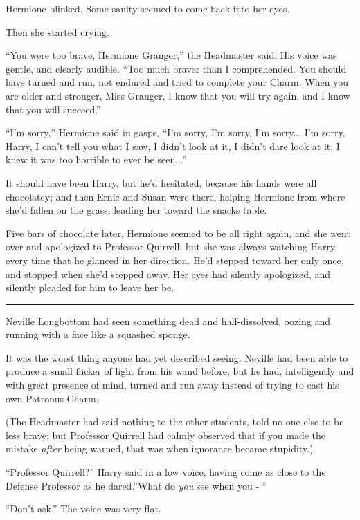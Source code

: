 Hermione blinked. Some sanity seemed to come back into her eyes.

Then she started crying.

``You were too brave, Hermione Granger,'' the Headmaster said. His voice
was gentle, and clearly audible. ``Too much braver than I comprehended.
You should have turned and run, not endured and tried to complete your
Charm. When you are older and stronger, Miss Granger, I know that you
will try again, and I know that you will succeed.''

``I'm sorry,'' Hermione said in gasps, ``I'm sorry, I'm sorry, I'm
sorry... I'm sorry, Harry, I can't tell you what I saw, I didn't
look at it, I didn't dare look at it, I knew it was too horrible to ever
be seen...''

It should have been Harry, but he'd hesitated, because his hands were
all chocolatey; and then Ernie and Susan were there, helping Hermione
from where she'd fallen on the grass, leading her toward the snacks
table.

Five bars of chocolate later, Hermione seemed to be all right again, and
she went over and apologized to Professor Quirrell; but she was always
watching Harry, every time that he glanced in her direction. He'd
stepped toward her only once, and stopped when she'd stepped away. Her
eyes had silently apologized, and silently pleaded for him to leave her
be.

\begin{center}\rule{3in}{0.4pt}\end{center}

Neville Longbottom had seen something dead and half-dissolved, oozing
and running with a face like a squashed sponge.

It was the worst thing anyone had yet described seeing. Neville had been
able to produce a small flicker of light from his wand before, but he
had, intelligently and with great presence of mind, turned and run away
instead of trying to cast his own Patronus Charm.

(The Headmaster had said nothing to the other students, told no one else
to be less brave; but Professor Quirrell had calmly observed that if you
made the mistake \emph{after} being warned, that was when ignorance
became stupidity.)

``Professor Quirrell?'' Harry said in a low voice, having come as close
to the Defense Professor as he dared.''What do \emph{you} see when you -
``

``Don't ask.'' The voice was very flat.

